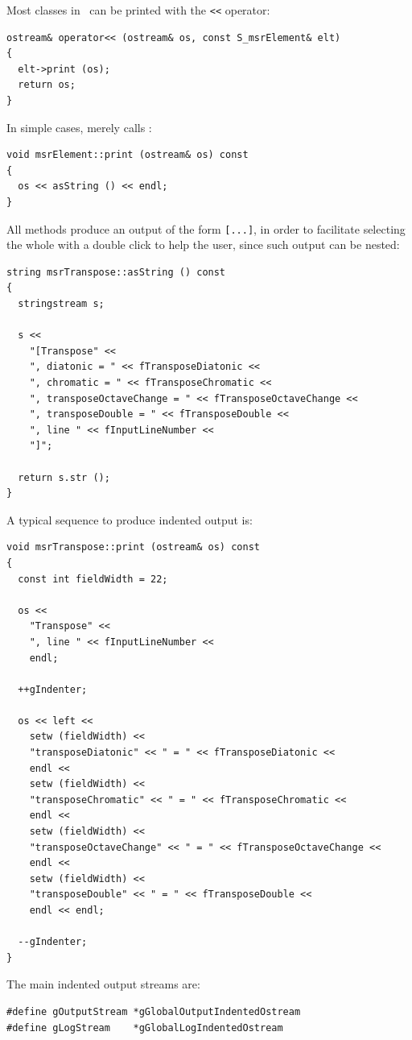 Most classes in \mf\ can be printed with the {\tt <<} operator:
\begin{lstlisting}[language=CPlusPlus]
ostream& operator<< (ostream& os, const S_msrElement& elt)
{
  elt->print (os);
  return os;
}
\end{lstlisting}

In simple cases,  merely calls :
\begin{lstlisting}[language=CPlusPlus]
void msrElement::print (ostream& os) const
{
  os << asString () << endl;
}
\end{lstlisting}

All  methods produce an output of the form {\tt [...]}, in order to facilitate selecting the whole with a double click to help the user, since such output can be nested:
\begin{lstlisting}[language=CPlusPlus]
string msrTranspose::asString () const
{
  stringstream s;

  s <<
    "[Transpose" <<
    ", diatonic = " << fTransposeDiatonic <<
    ", chromatic = " << fTransposeChromatic <<
    ", transposeOctaveChange = " << fTransposeOctaveChange <<
    ", transposeDouble = " << fTransposeDouble <<
    ", line " << fInputLineNumber <<
    "]";

  return s.str ();
}
\end{lstlisting}

A typical sequence to produce indented output is:
\begin{lstlisting}[language=CPlusPlus]
void msrTranspose::print (ostream& os) const
{
  const int fieldWidth = 22;

  os <<
    "Transpose" <<
    ", line " << fInputLineNumber <<
    endl;

  ++gIndenter;

  os << left <<
    setw (fieldWidth) <<
    "transposeDiatonic" << " = " << fTransposeDiatonic <<
    endl <<
    setw (fieldWidth) <<
    "transposeChromatic" << " = " << fTransposeChromatic <<
    endl <<
    setw (fieldWidth) <<
    "transposeOctaveChange" << " = " << fTransposeOctaveChange <<
    endl <<
    setw (fieldWidth) <<
    "transposeDouble" << " = " << fTransposeDouble <<
    endl << endl;

  --gIndenter;
}
\end{lstlisting}

The main indented output streams are:
\begin{lstlisting}[language=CPlusPlus]
#define gOutputStream *gGlobalOutputIndentedOstream
#define gLogStream    *gGlobalLogIndentedOstream

\end{lstlisting}


